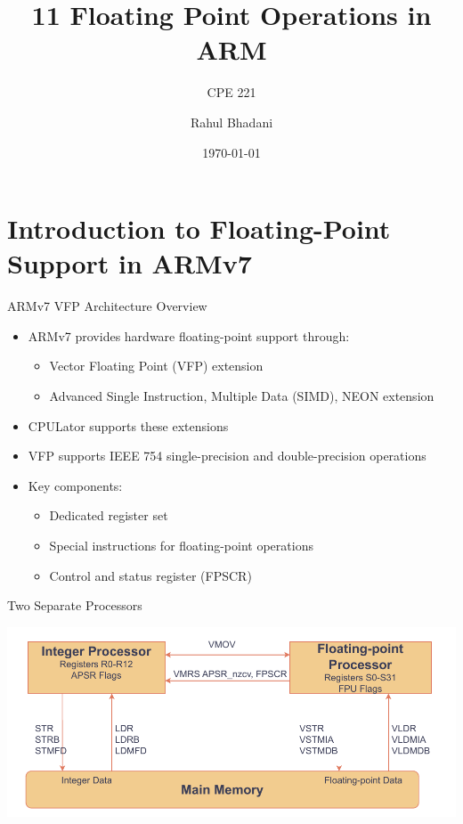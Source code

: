 \documentclass[aspectratio=169]{beamer}
\title{11 Floating Point Operations in ARM}
\subtitle{CPE 221}
\author{Rahul Bhadani}
\institute{The University of Alabama in Huntsville}
\date{\today}
\begin{document}
\begin{frame}

    \titlepage

\end{frame}

\begin{frame}{}
    \tableofcontents
\end{frame}

\section{Introduction to Floating-Point Support in ARMv7}
\begin{frame}
    \sectionpage
\end{frame}

\begin{frame}{ARMv7 VFP Architecture Overview}
\begin{itemize}
\item ARMv7 provides hardware floating-point support through:
\begin{itemize}
\item Vector Floating Point (VFP) extension
\item Advanced Single Instruction, Multiple Data (SIMD), NEON extension
\end{itemize}
\item CPULator supports these extensions
\item VFP supports IEEE 754 single-precision and double-precision operations
\item Key components:
\begin{itemize}
\item Dedicated register set
\item Special instructions for floating-point operations
\item Control and status register (FPSCR)
\end{itemize}
\end{itemize}
\end{frame}

\begin{frame}{Two Separate Processors}
    \begin{center}
        \includegraphics[width=1.0\textwidth]{../figures/Two_processors.pdf}
    \end{center}
\end{frame}
\end{document}
